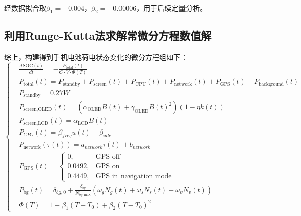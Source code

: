 \documentclass{mcmthesis}  %
\newcommand{\upcite}[1]{\textsuperscript{\textsuperscript{\cite{#1}}}}
\begin{document}
		经数据拟合取$\beta_1=-0.004$，$\beta_2=-0.00006$，用于后续定量分析\upcite{7}。
	
	\subsection{利用Runge-Kutta法求解常微分方程数值解}
	
	综上，构建得到手机电池荷电状态变化的微分方程组如下：
	\begin{equation}
		\left\{
		\begin{aligned}
			&\frac{d\,\text{SOC}(t)}{dt} = -\frac{P_{\text{total}}(t)}{C \cdot V \cdot \Phi(T)}
			\\
			&P_{\text{total}}(t) = P_{\text{standby}} + P_{\text{screen}}(t) + P_{\text{CPU}}(t) + P_{\text{network}}(t) + P_{\text{GPS}}(t) + P_{\text{background}}(t) \\
			&P_{\text{standby}}=0.27W
			\\
			&P_{\text{screen,OLED}}(t) = \left( \alpha_{\text{OLED}} B(t) + \gamma_{\text{OLED}} B(t)^2 \right) \left( 1 - \eta k(t) \right)
			\\
			&P_{\text{screen,LCD}}(t) = \alpha_{\text{LCD}} B(t) 
			\\
			&P_{CPU}(t)=\beta_{freq}u(t)+\beta_{idle} 
			\\
			&P_{\text{network}}(\tau(t)) = a_{network}\tau(t) + b_{network}
			\\
			&P_{\text{GPS}}(t) =
			\begin{cases}
				0, & \text{GPS off} \\
				0.0492, & \text{GPS on} \\
				0.4449, & \text{GPS in navigation mode}
			\end{cases}
			\\
			&P_{\text{bg}}(t) = \delta_{bg,0} + \frac{\delta_{bg}}{N_{bg,\text{max}}} \left( \omega_g N_g(t) + \omega_s N_s(t) + \omega_v N_v(t) \right)
			\\
			&\Phi(T) = 1 + \beta_1(T - T_0) + \beta_2(T - T_0)^2
		\end{aligned}
		\right.
	\end{equation}
	
\end{document}
